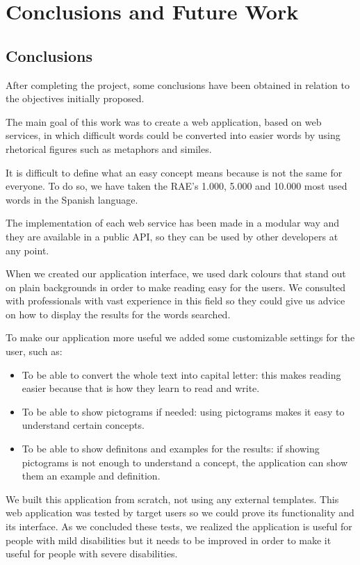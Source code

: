 \chapter{Conclusions and Future Work}
\label{cap:conclusions_futureWork}

\section{Conclusions}
\label{sec:conclusions}

After completing the project, some conclusions have been obtained in relation to the objectives initially proposed.

The main goal of this work was to create a web application, based on web services, in which difficult words could be converted into easier words by using  rhetorical figures such as metaphors and similes.

It is difficult to define what an easy concept means because is not the same for everyone. To do so, we have taken the RAE's 1.000, 5.000 and 10.000 most used words in the Spanish language.

The implementation of each web service has been made in a modular way and they are available in a public API, so they can be used by other developers at any point.

When we created our application interface, we used dark colours that stand out on plain backgrounds in order to make reading easy for the users. We consulted with professionals with vast experience in this field so they could give us advice on how to display the results for the words searched.

To make our application more useful we added some customizable settings for the user, such as:

\begin{itemize}
	\item To be able to convert the whole text into capital letter: this makes reading easier because that is how they learn to read and write.
	\item To be able to show pictograms if needed: using pictograms makes it easy to understand certain concepts.
	\item To be able to show definitons and examples for the results: if showing pictograms is not enough to understand a concept, the application can show them an example and definition.
\end{itemize}

We built this application from scratch, not using any external templates. This web application was tested by target users so we could prove its functionality and its interface. As we concluded these tests, we realized the application is useful for people with mild disabilities but it needs to be improved in order to make it useful for people with severe disabilities.

